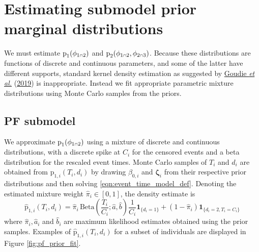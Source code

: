 \documentclass[
  10pt,
  a4paper,
]{article}
\let\Oldcap\cap
\renewcommand{\cap}{\mathrel{\mathsmaller{\Oldcap}}}
\newcommand{\pd}{\text{p}}
\begin{document}
\hypertarget{estimating-submodel-prior-marginal-distributions}{%
\section{Estimating submodel prior marginal
distributions}\label{estimating-submodel-prior-marginal-distributions}}

We must estimate \(\pd_{1}(\phi_{1 \cap 2})\) and
\(\pd_{2}(\phi_{1 \cap 2}, \phi_{2 \cap 3})\). Because these
distributions are functions of discrete and continuous parameters, and
some of the latter have different supports, standard kernel density
estimation as suggested by
\protect\hyperlink{ref-goudie_joining_2019}{Goudie \emph{et al.}}
(\protect\hyperlink{ref-goudie_joining_2019}{2019}) is inappropriate.
Instead we fit appropriate parametric mixture distributions using Monte
Carlo samples from the priors.

\hypertarget{pf-submodel}{%
\subsection{PF submodel}\label{pf-submodel}}

We approximate \(\pd_{1}(\phi_{1 \cap 2})\) using a mixture of discrete
and continuous distributions, with a discrete spike at \(C_{i}\) for the
censored events and a beta distribution for the rescaled event times.
Monte Carlo samples of \(T_{i}\) and \(d_{i}\) are obtained from
\(\pd_{1, i}(T_{i}, d_{i})\) by drawing \(\beta_{0, i}\) and
\(\boldsymbol{\zeta}_{i}\) from their respective prior distributions and
then solving \eqref{eqn:event_time_model_def}. Denoting the estimated
mixture weight \(\widehat{\pi}_{i} \in [0, 1]\), the density estimate is
\begin{equation}
  \widehat{\pd}_{1, i}(T_{i}, d_{i}) =
    \widehat{\pi}_{i} \, \text{Beta}\left(\frac{T_{i}}{C_{i}}; \widehat{a}, \widehat{b}\right) \frac{1}{C_{i}} \boldsymbol{1}_{\{d_{i} = 1\}} +
    (1 - \widehat{\pi}_{i}) \boldsymbol{1}_{\{d_{i} = 2, T_{i} = C_{i}\}}
  \label{eqn:pf-event-time-prior-dist}
\end{equation} where \(\widehat{\pi}_{i}, \widehat{a}_{i}\) and
\(\widehat{b}_{i}\) are maximum likelihood estimates obtained using the
prior samples. Examples of \(\widehat{\pd}_{1, i}(T_{i}, d_{i})\) for a
subset of individuals are displayed in Figure \ref{fig:pf_prior_fit}.
\end{document}
